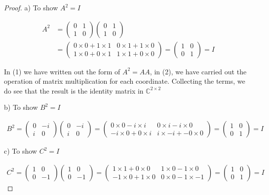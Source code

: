 \documentclass{article}
\begin{document}
\begin{proof}

a) To show $A^2 = I$

\begin{align}
A^2 &= \begin{pmatrix}
0 & 1 \\ 1 & 0
\end{pmatrix} \begin{pmatrix}
0 & 1 \\ 1 & 0
\end{pmatrix} \\
&= \begin{pmatrix}
0 \times 0 + 1 \times 1 & 0 \times 1 + 1 \times 0 \\ 1 \times 0 + 0 \times 1 & 1\times 1 + 0 \times 0
\end{pmatrix} = \begin{pmatrix}
1 & 0 \\ 0 & 1
\end{pmatrix} = I
\end{align}

In (1) we have written out the form of $A^2 = AA$, in (2), we have carried out the operation of matrix multiplication for each coordinate. Collecting the terms, we do see that the result is the identity matrix in $\mathbb{C}^{2 \times 2}$

b) To show $B^2 = I$

\begin{align}
B^2 = \begin{pmatrix}
0 & -i \\ i & 0
\end{pmatrix}
\begin{pmatrix}
0 & -i \\ i & 0
\end{pmatrix} = \begin{pmatrix}
0 \times 0 - i \times i & 0 \times i - i \times 0 \\
-i \times 0 + 0 \times i & i \times -i + - 0 \times 0
\end{pmatrix}
= \begin{pmatrix}
1 & 0 \\ 0 & 1
\end{pmatrix} = I
\end{align}

c) To show $C^2 = I$

\begin{align}
C^2 = \begin{pmatrix}
1 & 0 \\ 0 & -1
\end{pmatrix}
\begin{pmatrix}
1 & 0 \\ 0 & -1
\end{pmatrix}
= \begin{pmatrix}
1 \times 1 + 0 \times 0 & 1 \times 0 - 1 \times 0 \\
-1 \times 0 + 1 \times 0 & 0 \times 0 - 1 \times -1
\end{pmatrix}
= \begin{pmatrix}
1 & 0 \\ 0 & 1
\end{pmatrix} = I
\end{align}


\end{proof}
\end{document}
